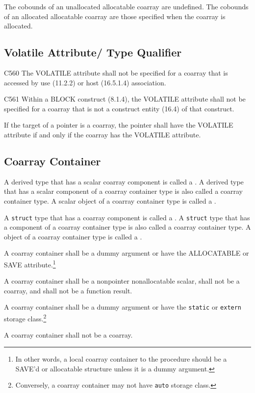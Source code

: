{\onlyF}
The cobounds of an unallocated allocatable coarray are undefined.
The cobounds of an allocated allocatable coarray are those specified 
when the coarray is allocated.

{\onlyC}


\subsection{Volatile {\onlyF} Attribute/{\onlyC} Type Qualifier}
\label{sec:Volatile}

C560 The VOLATILE attribute shall not be specified for a coarray that is accessed by use (11.2.2) or host (16.5.1.4) association.  %

C561 Within a BLOCK construct (8.1.4), the VOLATILE attribute shall not be specified for a coarray that is not a construct entity (16.4) of that construct.  %

If the target of a pointer is a coarray, the pointer shall have the VOLATILE attribute if and only if the coarray has the VOLATILE attribute.  %


\subsection{Coarray Container}
\label{sec:Coarray Container}

{\onlyF}
A derived type that has a scalar coarray component is called 
a .
A derived type that has a scalar component of a coarray container type 
is also called a coarray container type.
A scalar object of a coarray container type is called 
a .

{\onlyC}
A {\tt struct} type that has a coarray component is called 
a .
A {\tt struct} type that has a component of a coarray container type 
is also called a coarray container type.
A object of a coarray container type is called 
a .

\begin{Constraints F}
\item A coarray container shall be a dummy argument or have 
the ALLOCATABLE or SAVE attribute.\footnote
{In other words, a local coarray container to the procedure should be a SAVE'd or 
allocatable structure unless it is a dummy argument.}

\item A coarray container shall be a nonpointer nonallocatable scalar, 
shall not be a coarray, and shall not be a function result. 
\end{Constraints F}

\begin{Constraints C}
\item A coarray container shall be a dummy argument or have the {\tt static} 
or {\tt extern} storage class.\footnote
{Conversely, a coarray container may not have {\tt auto} storage class.}

\item A coarray container shall not be a coarray.

\end{Constraints C}

